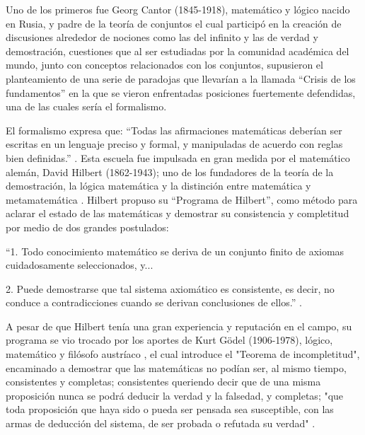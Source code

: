 \documentclass[11pt]{article}
\begin{document}
{Uno de los primeros fue Georg Cantor (1845-1918), matemático y lógico nacido en Rusia, y padre de la teoría de conjuntos \citep{CantorWiki} el cual participó en la creación de discusiones alrededor de nociones como las del infinito y las de verdad y demostración, cuestiones que al ser estudiadas por la comunidad académica del mundo, junto con conceptos relacionados con los conjuntos, supusieron el planteamiento de una serie de  paradojas que llevarían a la llamada “Crisis de los fundamentos” en la que se vieron enfrentadas posiciones fuertemente defendidas, una de las cuales sería el formalismo.
\newline

El formalismo expresa que: “Todas las afirmaciones matemáticas deberían ser escritas en un lenguaje preciso y formal, y manipuladas de acuerdo con reglas bien definidas.” \citep{AndresAbeliuk}. Esta escuela fue impulsada en gran medida por el matemático alemán, David Hilbert (1862-1943); uno de los fundadores de la teoría de la demostración, la lógica matemática y la distinción entre matemática y metamatemática \citep{HilbertWiki}. Hilbert propuso su “Programa de Hilbert”, como método para aclarar el estado de las matemáticas y demostrar su consistencia y completitud por medio de dos grandes postulados: 
\newline

“1. Todo conocimiento matemático se deriva de un conjunto finito de axiomas cuidadosamente seleccionados, y...

2. Puede demostrarse que tal sistema axiomático es consistente, es decir, no conduce a contradicciones cuando se derivan conclusiones de ellos.” \citep{IncytdeMorales}.
\newline

A pesar de que Hilbert tenía una gran experiencia y reputación en el campo, su programa se vio trocado por los aportes de Kurt Gödel (1906-1978), lógico, matemático y filósofo austríaco \citep{GodelWiki}, el cual introduce el "Teorema de incompletitud", encaminado a demostrar que las matemáticas no podían ser, al mismo tiempo, consistentes y completas; consistentes queriendo decir que de una misma proposición nunca se podrá deducir la verdad y la falsedad, y completas; "que toda proposición que haya sido o pueda ser pensada sea susceptible, con las armas de deducción del sistema, de ser probada o refutada su verdad" \citep{ScieloCrespo}. 
\newline

}
\end{document}
